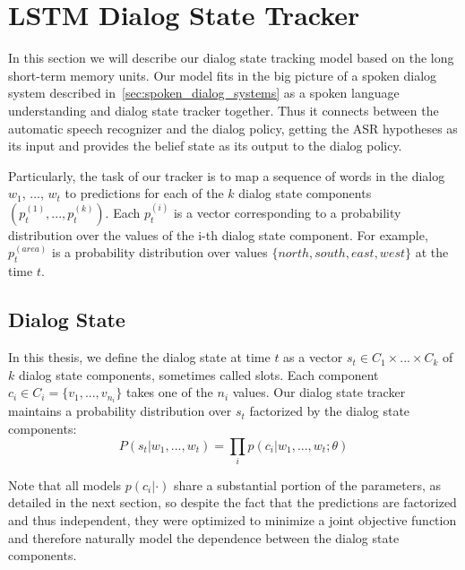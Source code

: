 \documentclass[runningheads,a4paper]{llncs}
\begin{document}
\section{LSTM Dialog State Tracker}
\label{sec:lstm_dialog_state_tracker}
In this section we will describe our dialog state tracking model based on the long short-term memory units. Our model fits in the big picture of a spoken dialog system described in~\autoref{sec:spoken_dialog_systems} as a spoken language understanding and dialog state tracker together. Thus it connects between the automatic speech recognizer and the dialog policy, getting the ASR hypotheses as its input and provides the belief state as its output to the dialog policy.

Particularly, the task of our tracker is to map a sequence of words in the dialog $w_1$, ..., $w_t$ to predictions for each of the $k$ dialog state components $(p^{(1)}_t, ..., p^{(k)}_t)$. Each $p^{(i)}_t$ is a vector corresponding to a probability distribution over the values of the i-th dialog state component. For example, $p^{(area)}_t$ is a probability distribution over values $\{north, south, east, west\}$ at the time $t$.

\subsection{Dialog State}
In this thesis, we define the dialog state at time $t$ as a vector $s_t \in C_1 \times ... \times C_k$ of $k$ dialog state components, sometimes called slots. Each component $c_i \in C_i=\{v_1, ..., v_{n_i}\}$ takes one of the $n_i$ values. Our dialog state tracker maintains a probability distribution over $s_t$ factorized by the dialog state components:
\begin{equation}P(s_t|w_1, ..., w_t)=\prod_i p(c_i|w_1, ..., w_t; \theta)\end{equation}

Note that all models $p(c_i|\cdot)$ share a substantial portion of the parameters, as detailed in the next section, so despite the fact that the predictions are factorized and thus independent, they were optimized to minimize a joint objective function and therefore naturally model the dependence between the dialog state components.
\end{document}
